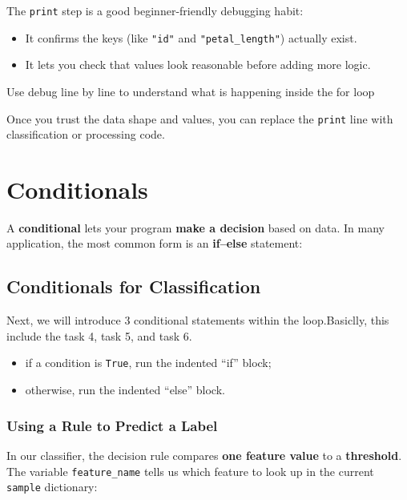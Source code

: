\begin{tcolorbox}[title=Good Practice]
The \texttt{print} step is a good beginner-friendly debugging habit:
\begin{itemize}
  \item It confirms the keys (like \texttt{"id"} and \texttt{"petal\_length"}) actually exist.
  \item It lets you check that values look reasonable before adding more logic.
\end{itemize}

Use debug line by line to understand what is happening inside the for loop
\end{tcolorbox}





\noindent
Once you trust the data shape and values, you can replace the \texttt{print} line with classification or processing code.


\section{Conditionals}
A \textbf{conditional} lets your program \textbf{make a decision} based on data. In many application, the most common form is an \textbf{if--else} statement:

\subsection{Conditionals for Classification}
Next, we will introduce 3 conditional statements within the loop.Basiclly, this include the task 4, task 5, and task 6.

\label{sec:ses3_conditionals}




\begin{itemize}
  \item if a condition is \texttt{True}, run the indented ``if'' block;
  \item otherwise, run the indented ``else'' block.
\end{itemize}

\subsubsection{Using a Rule to Predict a Label}
In our classifier, the decision rule compares \textbf{one feature value} to a \textbf{threshold}. The variable \texttt{feature\_name} tells us which feature to look up in the current \texttt{sample} dictionary:


